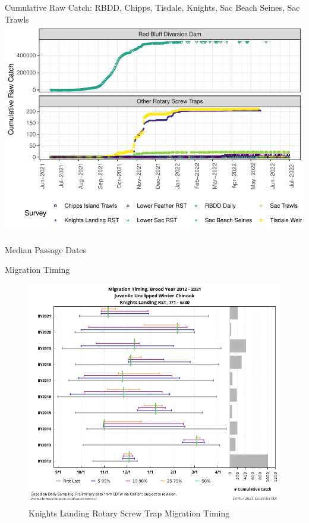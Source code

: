 \documentclass[
]{book}
\theoremstyle{definition}
\theoremstyle{definition}
\theoremstyle{definition}
\theoremstyle{definition}
\theoremstyle{remark}
\begin{document}
Cumulative Raw Catch: RBDD, Chipps, Tisdale, Knights, Sac Beach Seines, Sac Trawls
\includegraphics{_main_files/figure-latex/juvtiming-fig-1.pdf}

Median Passage Dates

Migration Timing

\begin{figure}
\includegraphics[width=1.5\linewidth]{figures/migtiming2021_knights} \caption{Knights Landing Rotary Screw Trap Migration Timing}\label{fig:knights-timing-fig}
\end{figure}
\end{document}
